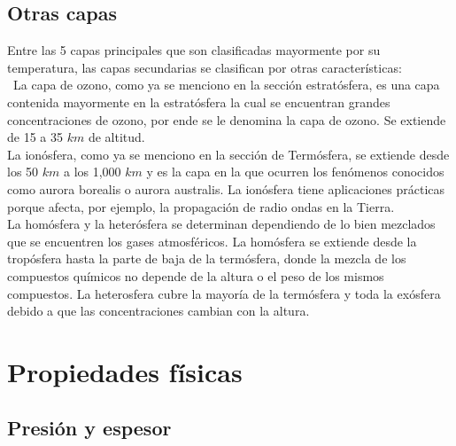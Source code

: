 \documentclass{article} %
\begin{document}
\subsection{Otras capas}
Entre las 5 capas principales que son clasificadas mayormente por su temperatura, las capas secundarias se clasifican por otras características: ~\\
~\indent La capa de ozono, como ya se menciono en la sección estratósfera, es una capa contenida mayormente en la estratósfera la cual se encuentran grandes concentraciones de ozono, por ende se le denomina la capa de ozono. Se extiende de 15 a 35 $km$ de altitud.~\\
\indent La ionósfera, como ya se menciono en la sección de Termósfera, se extiende desde los 50 $km$ a los 1,000 $km$ y es la capa en la que ocurren los fenómenos conocidos como aurora borealis o aurora australis. La ionósfera tiene aplicaciones prácticas porque afecta, por ejemplo, la propagación de radio ondas en la Tierra.~\\
\indent La homósfera y la heterósfera se determinan dependiendo de lo bien mezclados que se encuentren los gases atmosféricos. La homósfera se extiende desde la tropósfera hasta la parte de baja de la termósfera, donde la mezcla de los compuestos químicos no depende de la altura o el peso de los mismos compuestos. La heterosfera cubre la mayoría de la termósfera y toda la exósfera debido a que las concentraciones cambian con la altura.

\newpage

\section{Propiedades físicas}
\subsection{Presión y espesor}
\end{document}
